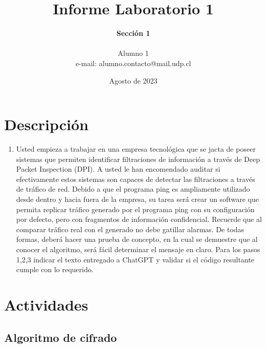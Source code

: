 \documentclass[letter,12pt]{article}
\begin{document}
%
   \title{\Huge{Informe Laboratorio 1}}

   \author{\textbf{Sección 1} \\  \\Alumno 1 \\ e-mail: alumno.contacto@mail.udp.cl}
          
   \date{Agosto de 2023}

   \maketitle
   
   \tableofcontents
 
  \newpage
  

\section{Descripción}

\begin{enumerate}
    \item  Usted empieza a trabajar en una empresa tecnológica que se jacta de poseer sistemas que permiten identificar filtraciones de información a través de Deep Packet Inspection (DPI).
    A usted le han encomendado auditar si efectivamente estos sistemas son capaces de detectar las filtraciones a través de tráfico de red. Debido a que el programa ping es ampliamente utilizado desde dentro y hacia fuera de la empresa, su tarea será crear un software que permita replicar tráfico generado por el programa ping con su configuración por defecto, pero con fragmentos de información confidencial. Recuerde que al comparar tráfico real con el generado no debe gatillar alarmas.
    De todas formas, deberá hacer una prueba de concepto, en la cual se demuestre que al conocer el algoritmo, será fácil determinar el mensaje en claro.
    Para los pasos 1,2,3 indicar el texto entregado a ChatGPT y validar si el código resultante cumple con lo requerido.


\end{enumerate}


\section{Actividades}


\subsection{Algoritmo de cifrado}
\end{document}
